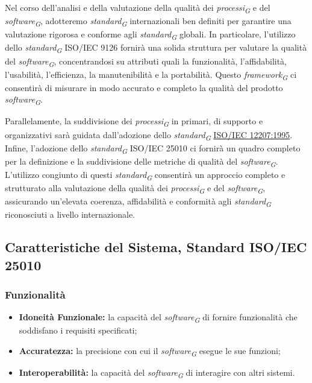 Nel corso dell'analisi e della valutazione della qualità dei \textit{processi}\textsubscript{\textit{G}} e del \textit{software}\textsubscript{\textit{G}}, adotteremo \textit{standard}\textsubscript{\textit{G}} internazionali ben definiti per garantire una valutazione rigorosa e conforme agli \textit{standard}\textsubscript{\textit{G}} globali. In particolare, l'utilizzo dello \textit{standard}\textsubscript{\textit{G}} ISO/IEC 9126 fornirà una solida struttura per valutare la qualità del \textit{software}\textsubscript{\textit{G}}, concentrandosi su attributi quali la funzionalità, l'affidabilità, l'usabilità, l'efficienza, la manutenibilità e la portabilità. Questo \textit{framework}\textsubscript{\textit{G}} ci consentirà di misurare in modo accurato e completo la qualità del prodotto \textit{software}\textsubscript{\textit{G}}.

\vspace{0.2cm}

Parallelamente, la suddivisione dei \textit{processi}\textsubscript{\textit{G}} in primari, di supporto e organizzativi sarà guidata dall'adozione dello \textit{standard}\textsubscript{\textit{G}} \href{https://www.math.unipd.it/~tullio/IS-1/2009/Approfondimenti/ISO_12207-1995.pdf}{ISO/IEC 12207:1995}. Infine, l'adozione dello \textit{standard}\textsubscript{\textit{G}} ISO/IEC 25010 ci fornirà un quadro completo per la definizione e la suddivisione delle metriche di qualità del \textit{software}\textsubscript{\textit{G}}.
L'utilizzo congiunto di questi \textit{standard}\textsubscript{\textit{G}} consentirà un approccio completo e strutturato alla valutazione della qualità dei \textit{processi}\textsubscript{\textit{G}} e del \textit{software}\textsubscript{\textit{G}}, assicurando un'elevata coerenza, affidabilità e conformità agli \textit{standard}\textsubscript{\textit{G}} riconosciuti a livello internazionale.

\subsection{Caratteristiche del Sistema, Standard ISO/IEC 25010}

\subsubsection{Funzionalità}
\begin{itemize}
    \item \textbf{Idoneità Funzionale:} la capacità del \textit{software}\textsubscript{\textit{G}} di fornire funzionalità che soddisfano i requisiti specificati;
    \item \textbf{Accuratezza:} la precisione con cui il \textit{software}\textsubscript{\textit{G}} esegue le sue funzioni;
    \item \textbf{Interoperabilità:} la capacità del \textit{software}\textsubscript{\textit{G}} di interagire con altri sistemi.
\end{itemize}
\pagebreak

